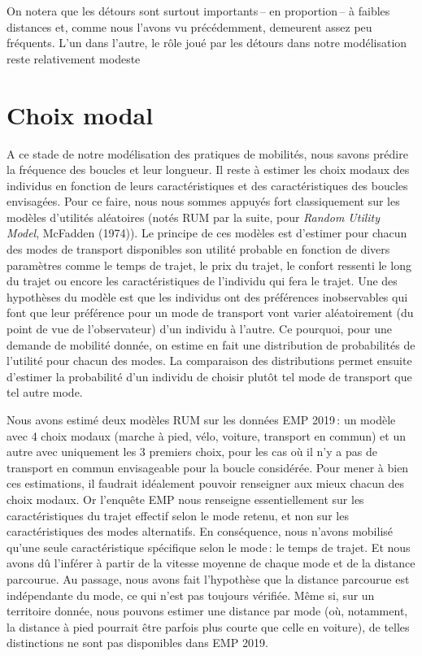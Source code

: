 \documentclass[
  9pt,
  a4paper,
  DIV=11]{scrreprt}
\begin{document}
On notera que les détours sont surtout importants\,-- en proportion\,--
à faibles distances et, comme nous l'avons vu précédemment, demeurent
assez peu fréquents. L'un dans l'autre, le rôle joué par les détours
dans notre modélisation reste relativement modeste

\section{Choix modal}\label{choix-modal}

A ce stade de notre modélisation des pratiques de mobilités, nous savons
prédire la fréquence des boucles et leur longueur. Il reste à estimer
les choix modaux des individus en fonction de leurs caractéristiques et
des caractéristiques des boucles envisagées. Pour ce faire, nous nous
sommes appuyés fort classiquement sur les modèles d'utilités aléatoires
(notés RUM par la suite, pour \emph{Random Utility Model}, McFadden
(1974)). Le principe de ces modèles est d'estimer pour chacun des modes
de transport disponibles son utilité probable en fonction de divers
paramètres comme le temps de trajet, le prix du trajet, le confort
ressenti le long du trajet ou encore les caractéristiques de l'individu
qui fera le trajet. Une des hypothèses du modèle est que les individus
ont des préférences inobservables qui font que leur préférence pour un
mode de transport vont varier aléatoirement (du point de vue de
l'observateur) d'un individu à l'autre. Ce pourquoi, pour une demande de
mobilité donnée, on estime en fait une distribution de probabilités de
l'utilité pour chacun des modes. La comparaison des distributions permet
ensuite d'estimer la probabilité d'un individu de choisir plutôt tel
mode de transport que tel autre mode.

Nous avons estimé deux modèles RUM sur les données EMP 2019\,: un modèle
avec 4 choix modaux (marche à pied, vélo, voiture, transport en commun)
et un autre avec uniquement les 3 premiers choix, pour les cas où il n'y
a pas de transport en commun envisageable pour la boucle considérée.
Pour mener à bien ces estimations, il faudrait idéalement pouvoir
renseigner aux mieux chacun des choix modaux. Or l'enquête EMP nous
renseigne essentiellement sur les caractéristiques du trajet effectif
selon le mode retenu, et non sur les caractéristiques des modes
alternatifs. En conséquence, nous n'avons mobilisé qu'une seule
caractéristique spécifique selon le mode\,: le temps de trajet. Et nous
avons dû l'inférer à partir de la vitesse moyenne de chaque mode et de
la distance parcourue. Au passage, nous avons fait l'hypothèse que la
distance parcourue est indépendante du mode, ce qui n'est pas toujours
vérifiée. Même si, sur un territoire donnée, nous pouvons estimer une
distance par mode (où, notamment, la distance à pied pourrait être
parfois plus courte que celle en voiture), de telles distinctions ne
sont pas disponibles dans EMP 2019.
\end{document}
